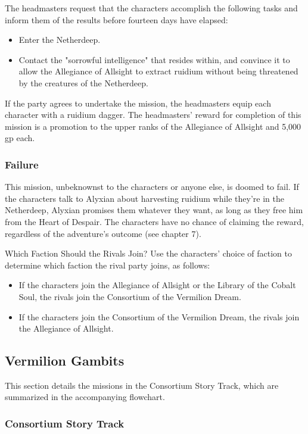 \documentclass[10pt,a4,twoside,twocolumn,openany,nodeprecatedcode]{dndbook}
\begin{document}
The headmasters request that the characters accomplish the following tasks and inform them of the results before fourteen days have elapsed:
\begin{itemize}

\item Enter the Netherdeep.
\item Contact the "sorrowful intelligence" that resides within, and convince it to allow the Allegiance of Allsight to extract ruidium without being threatened by the creatures of the Netherdeep.
\end{itemize}


If the party agrees to undertake the mission, the headmasters equip each character with a ruidium dagger. The headmasters' reward for completion of this mission is a promotion to the upper ranks of the Allegiance of Allsight and 5,000 gp each.
\subsubsection{Failure}
This mission, unbeknownst to the characters or anyone else, is doomed to fail. If the characters talk to Alyxian about harvesting ruidium while they're in the Netherdeep, Alyxian promises them whatever they want, as long as they free him from the Heart of Despair. The characters have no chance of claiming the reward, regardless of the adventure's outcome (see chapter 7).
\begin{DndComment}{Which Faction Should the Rivals Join?}
Use the characters' choice of faction to determine which faction the rival party joins, as follows:
\begin{itemize}

\item If the characters join the Allegiance of Allsight or the Library of the Cobalt Soul, the rivals join the Consortium of the Vermilion Dream.
\item If the characters join the Consortium of the Vermilion Dream, the rivals join the Allegiance of Allsight.
\end{itemize}


\end{DndComment}

\subsection{Vermilion Gambits}
This section details the missions in the Consortium Story Track, which are summarized in the accompanying flowchart.
\subsubsection{Consortium Story Track}
\end{document}
